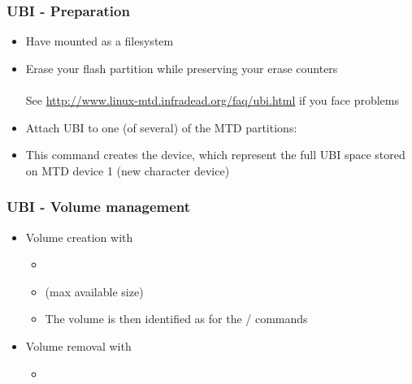 \begin{frame}
  \frametitle{UBI - Preparation}
  \begin{itemize}
  \item Have  mounted as a  filesystem
  \item Erase your flash partition while preserving your erase counters\\
    \\
    See \url{http://www.linux-mtd.infradead.org/faq/ubi.html} if you
    face problems
  \item Attach UBI to one (of several) of the MTD partitions:\\
  \item This command creates the  device, which represent
    the full UBI space stored on MTD device 1 (new 
    character device)
  \end{itemize}
\end{frame}

\begin{frame}
  \frametitle{UBI - Volume management}
  \begin{itemize}
  \item Volume creation with 
    \begin{itemize}
    \item {}
    \item {} (max available size)
    \item The volume is then identified as  for the
      / commands
    \end{itemize}
  \item Volume removal with 
    \begin{itemize}
    \item {}
    \end{itemize}
  \end{itemize}
\end{frame}

